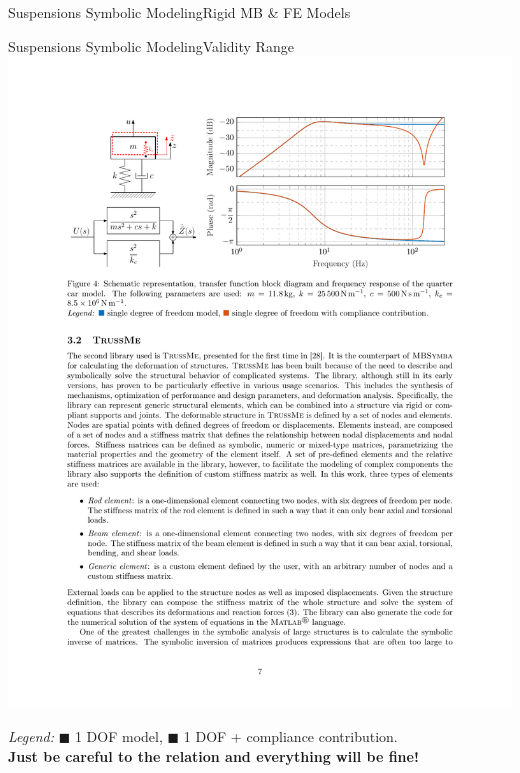 \begin{frame}{Suspensions Symbolic Modeling}{Rigid \acs{MB} \& \acs{FE} Models}
\begin{minipage}[c]{0.40\linewidth}
  \end{minipage}
\end{frame}

\begin{frame}{Suspensions Symbolic Modeling}{Validity Range}
   \\[0.5em]
  \includegraphics[width=0.9\linewidth]{./figures/frequency_response.pdf}
  \begin{center}
    \emph{Legend:}
    {\color{mycolor1}$\blacksquare$} 1 DOF model, {\color{mycolor2}$\blacksquare$} 1 DOF + compliance contribution. \\[0.5em]
    \textcolor{mycolor5}{\textbf{Just be careful to the relation  and everything will be fine!}}
  \end{center}
\end{frame}


